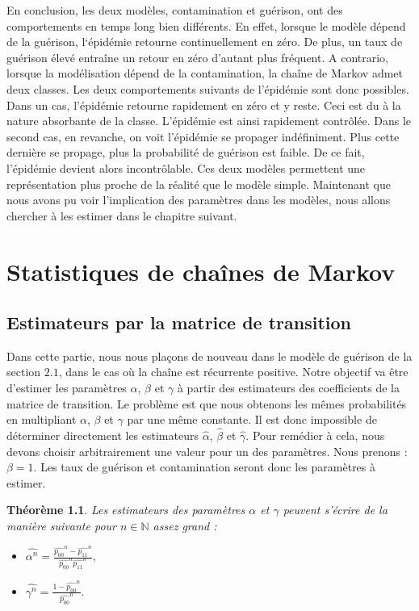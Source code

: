 \documentclass[12pt,a4paper]{report}
\newtheorem{thm}{Théorème}[section]
\theoremstyle{remark}
\begin{document}
\vspace{1.5cm}
En conclusion, les deux modèles, contamination et guérison, ont des comportements en temps long bien différents. En effet, lorsque le modèle dépend de la guérison, l‘épidémie retourne continuellement en zéro. De plus, un taux de guérison élevé entraîne un retour en zéro d’autant plus fréquent.
A contrario, lorsque la modélisation dépend de la contamination, la chaîne de Markov admet deux classes. Les deux comportements suivants de l’épidémie sont donc possibles. Dans un cas, l’épidémie retourne rapidement  en zéro et y reste. Ceci est du à la nature absorbante de la classe. L’épidémie est ainsi rapidement contrôlée. Dans le second cas, en revanche, on voit l’épidémie se propager indéfiniment. Plus cette dernière se propage, plus la probabilité de guérison est faible. De ce fait, l’épidémie devient alors incontrôlable. Ces deux modèles permettent une représentation plus proche de la réalité que le modèle simple. Maintenant que nous avons pu voir l'implication des paramètres dans les modèles, nous allons chercher à les estimer dans le chapitre suivant.

\newpage
\chapter{Statistiques de chaînes de Markov}

\section{Estimateurs par la matrice de transition}
\vspace{0.6cm}

Dans cette partie, nous nous plaçons de nouveau dans le modèle de guérison de la section $2.1$, dans le cas où la chaîne est récurrente positive. Notre objectif va être d'estimer les paramètres $\alpha$, $\beta$ et $\gamma$ à partir des estimateurs des coefficients de la matrice de transition. Le problème est que nous obtenons les mêmes probabilités en multipliant $\alpha$, $\beta$ et $\gamma$ par une même constante. Il est donc impossible de déterminer directement les estimateurs $\hat{\alpha}$, $\hat{\beta}$ et $\hat{\gamma}$. Pour remédier à cela, nous devons choisir arbitrairement une valeur pour un des paramètres. Nous prenons : $\beta = 1$. Les taux de guérison et contamination seront donc les paramètres à estimer.

\begin{thm}\label{expression_alpha_gamma}
Les estimateurs des paramètres $\alpha$ et $\gamma$ peuvent s'écrire de la manière suivante pour $n \in \mathbb{N}$ assez grand : \\
\begin{itemize}
    \item $\hat{\alpha^n} =\frac{\hat{p_{00}}^n- \hat{p_{11}}^n}{\hat{p_{00}}^n\hat{p_{11}}^n},$\\
    \item $\hat{\gamma^n} =\frac{1-\hat{p_{00}}^n}{\hat{p_{00}}^n}.$
\end{itemize}
\end{thm}
\end{document}
